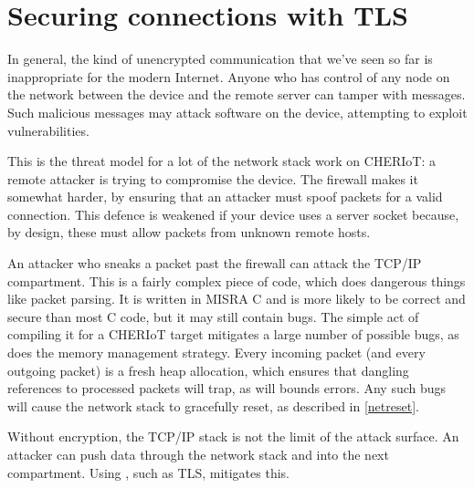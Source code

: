 {

\section{Securing connections with TLS}

In general, the kind of unencrypted communication that we've seen so far is inappropriate for the modern Internet.
Anyone who has control of any node on the network between the device and the remote server can tamper with messages.
Such malicious messages may attack software on the device, attempting to exploit vulnerabilities.

This is the threat model for a lot of the network stack work on CHERIoT: a remote attacker is trying to compromise the device.
The firewall makes it somewhat harder, by ensuring that an attacker must spoof packets for a valid connection.
This defence is weakened if your device uses a server socket because, by design, these must allow packets from unknown remote hosts.

An attacker who sneaks a packet past the firewall can attack the TCP/IP compartment.
This is a fairly complex piece of code, which does dangerous things like packet parsing.
It is written in MISRA C and is more likely to be correct and secure than most C code, but it may still contain bugs.
The simple act of compiling it for a CHERIoT target mitigates a large number of possible bugs, as does the memory management strategy.
Every incoming packet (and every outgoing packet) is a fresh heap allocation, which ensures that dangling references to processed packets will trap, as will bounds errors.
Any such bugs will cause the network stack to gracefully reset, as described in \ref{netreset}.

Without encryption, the TCP/IP stack is not the limit of the attack surface.
An attacker can push data through the network stack and into the next compartment.
Using , such as TLS, mitigates this.

}
